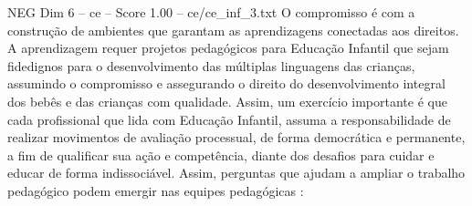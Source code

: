 \begin{textsample}{NEG Dim 6 – ce – Score 1.00 – ce/ce\_inf\_3.txt}
O compromisso é com a construção de ambientes que garantam as aprendizagens conectadas aos direitos.
A aprendizagem requer projetos pedagógicos para Educação Infantil que sejam fidedignos para o desenvolvimento das múltiplas linguagens das crianças, assumindo o compromisso e assegurando o direito do desenvolvimento integral dos bebês e das crianças com qualidade.
Assim, um exercício importante é que cada profissional que lida com Educação Infantil, assuma a responsabilidade de realizar movimentos de avaliação processual, de forma democrática e permanente, a fim de qualificar sua ação e competência, diante dos desafios para cuidar e educar de forma indissociável.
Assim, perguntas que ajudam a ampliar o trabalho pedagógico podem emergir nas equipes pedagógicas :

\end{textsample}
